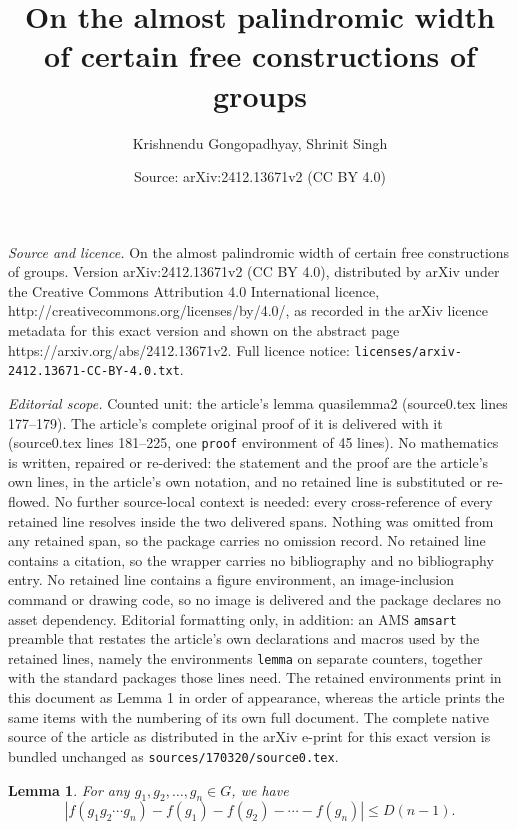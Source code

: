 \documentclass[10pt,a4paper]{amsart}
\title{On the almost palindromic width of certain free constructions of groups}
\author{Krishnendu Gongopadhyay, Shrinit Singh}
\date{Source: arXiv:2412.13671v2 (CC BY 4.0)}
\newtheorem{lemma}{Lemma}
\begin{document}
\maketitle

\noindent\emph{Source and licence.} On the almost palindromic width of certain free constructions of groups. Version arXiv:2412.13671v2 (CC BY 4.0), distributed by arXiv under the Creative Commons Attribution 4.0 International licence, http://creativecommons.org/licenses/by/4.0/, as recorded in the arXiv licence metadata for this exact version and shown on the abstract page https://arxiv.org/abs/2412.13671v2. Full licence notice: \texttt{licenses/arxiv-2412.13671-CC-BY-4.0.txt}.\par\smallskip

\noindent\textit{Editorial scope.} Counted unit: the article's lemma quasilemma2 (source0.tex lines 177--179). The article's complete original proof of it is delivered with it (source0.tex lines 181--225, one \texttt{proof} environment of 45 lines). No mathematics is written, repaired or re-derived: the statement and the proof are the article's own lines, in the article's own notation, and no retained line is substituted or re-flowed.  No further source-local context is needed: every cross-reference of every retained line resolves inside the two delivered spans.  Nothing was omitted from any retained span, so the package carries no omission record.  No retained line contains a citation, so the wrapper carries no bibliography and no bibliography entry.  No retained line contains a figure environment, an image-inclusion command or drawing code, so no image is delivered and the package declares no asset dependency.  Editorial formatting only, in addition: an AMS \texttt{amsart} preamble that restates the article's own declarations and macros used by the retained lines, namely the environments \texttt{lemma} on separate counters, together with the standard packages those lines need.  The retained environments print in this document as Lemma 1 in order of appearance, whereas the article prints the same items with the numbering of its own full document.  The complete native source of the article as distributed in the arXiv e-print for this exact version is bundled unchanged as \texttt{sources/170320/source0.tex}.
\begin{lemma}\label{quasilemma2}
    For any $g_1,g_2, \ldots, g_n \in G$, we have $$|f(g_1g_2 \cdots g_n) - f(g_1) - f(g_2) - \cdots - f(g_n)| \leq D(n-1).$$
\end{lemma}
\end{document}

